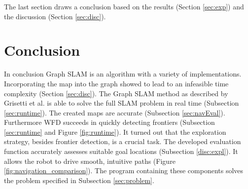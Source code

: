 \documentclass{ba-kecs}
\begin{document}
The last section draws a conclusion based on the results (Section \ref{sec:exp}) and the discussion (Section \ref{sec:disc}).
\section{Conclusion}
\label{sec:conc}
In conclusion Graph SLAM is an algorithm with a variety of implementations. Incorporating the map into the graph showed to lead to an infeasible time complexity (Section \ref{sec:disc}). The Graph SLAM method as described by Grisetti et al. \citep{Grisetti} is able to solve the full SLAM problem in real time (Subsection \ref{sec:runtime}). The created maps are accurate (Subsection \ref{sec:navEval}). Furthermore WFD succeeds in quickly detecting frontiers (Subsection \ref{sec:runtime} and Figure \ref{fig:runtime}). It turned out that the exploration strategy, besides frontier detection, is a crucial task. The developed evaluation function accurately assesses suitable goal locations (Subsection \ref{disc:expl}). It allows the robot to drive smooth, intuitive paths (Figure \ref{fig:navigation_comparison}). The program containing these components solves the problem specified in Subsection \ref{sec:problem}.


\nocite{*}
\onecolumn
\appendix
\end{document}
